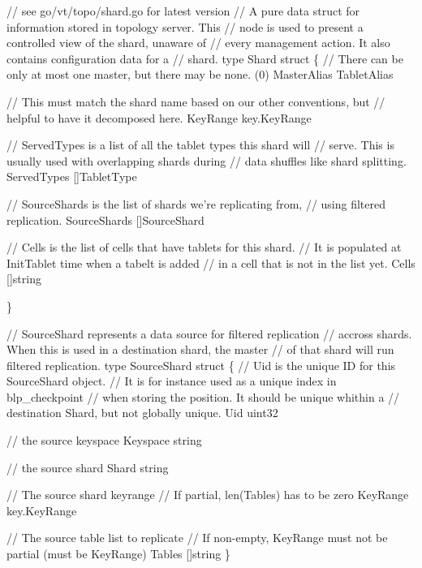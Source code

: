 \begin{codesample2}
  // see go/vt/topo/shard.go for latest version
  // A pure data struct for information stored in topology server.  This
  // node is used to present a controlled view of the shard, unaware of
  // every management action. It also contains configuration data for a
  // shard.
  type Shard struct \{
      // There can be only at most one master, but there may be none. (0)
       MasterAlias TabletAlias
  
      // This must match the shard name based on our other conventions, but
      // helpful to have it decomposed here.
      KeyRange key.KeyRange
  
      // ServedTypes is a list of all the tablet types this shard will
      // serve. This is usually used with overlapping shards during
      // data shuffles like shard splitting.
      ServedTypes []TabletType
  
      // SourceShards is the list of shards we're replicating from,
      // using filtered replication.
      SourceShards []SourceShard
  
      // Cells is the list of cells that have tablets for this shard.
      // It is populated at InitTablet time when a tabelt is added
      // in a cell that is not in the list yet.
      Cells []string
  
  \}
\end{codesample2}
  
\begin{codesample2}
  // SourceShard represents a data source for filtered replication
  // accross shards. When this is used in a destination shard, the master
  // of that shard will run filtered replication.
  type SourceShard struct \{
          // Uid is the unique ID for this SourceShard object.
          // It is for instance used as a unique index in blp_checkpoint
          // when storing the position. It should be unique whithin a
          // destination Shard, but not globally unique.
          Uid uint32
  
      // the source keyspace
      Keyspace string
  
      // the source shard
      Shard string
  
      // The source shard keyrange
      // If partial, len(Tables) has to be zero
      KeyRange key.KeyRange
  
      // The source table list to replicate
      // If non-empty, KeyRange must not be partial (must be KeyRange{})
      Tables []string
  \}
\end{codesample2}

